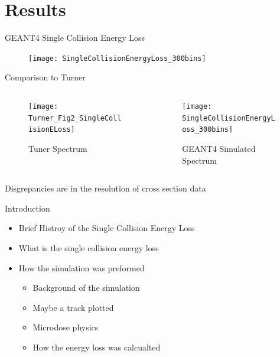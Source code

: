 \documentclass[compress]{beamer}
\begin{document}
\section{Results}
\begin{frame}{GEANT4 Single Collision Energy Loss}
  \begin{figure}
    \texttt{[image: SingleCollisionEnergyLoss\_300bins]}
  \end{figure}
\end{frame}
\begin{frame}{Comparison to Turner}
  \begin{columns}[onlytextwidth]
    \begin{column}{0.45\textwidth}
      \begin{figure}
        \texttt{[image: Turner\_Fig2\_SingleCollisionELoss]}
        \caption{Tuner Spectrum}
      \end{figure}
    \end{column}
    \begin{column}{0.45\textwidth}
      \begin{figure}
        \texttt{[image: SingleCollisionEnergyLoss\_300bins]}
        \caption{GEANT4 Simulated Spectrum}
    \end{figure}
    \end{column}
  \end{columns}
\vspace{2mm}
Disgrepancies are in the resolution of cross section data
\end{frame}
\begin{frame}{Introduction}
	\begin{itemize}
		\item Brief Histroy of the Single Collision Energy Loss
		\item What is the single collision energy loss
		\item How the simulation was preformed
		\begin{itemize}
			\item Background of the simulation
			\item Maybe a track plotted
			\item Microdose physics
			\item How the energy loss was calcualted
		\end{itemize}
	\end{itemize}
\end{frame}
\end{document}

